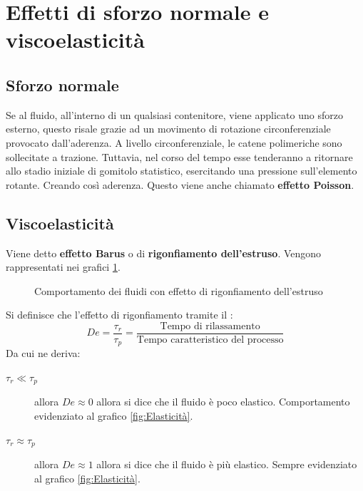 \section{Effetti di sforzo normale e viscoelasticità}
\subsection{Sforzo normale}
Se al fluido, all'interno di un qualsiasi contenitore, viene applicato uno sforzo esterno, questo risale grazie ad un movimento di rotazione circonferenziale provocato dall'aderenza.
A livello circonferenziale, le catene polimeriche sono sollecitate a trazione. Tuttavia, nel corso del tempo esse tenderanno a ritornare allo stadio iniziale di gomitolo statistico, esercitando una pressione sull'elemento rotante. Creando così aderenza.
Questo viene anche chiamato \textbf{effetto Poisson}.

\subsection{Viscoelasticità}
Viene detto \textbf{effetto Barus} o di \textbf{rigonfiamento dell'estruso}.
Vengono rappresentati nei grafici \ref{fig:RigonfiamentoEstruso}.

\begin{figure}
\centering
{}\quad
{}
\caption{Comportamento dei fluidi con effetto di rigonfiamento dell'estruso}
\label{fig:RigonfiamentoEstruso}
\end{figure}

Si definisce che l'effetto di rigonfiamento tramite il :
\begin{equation}
De = \frac{\tau_r}{\tau_p} = \frac{\text{Tempo di rilassamento}}{\text{Tempo caratteristico del processo}}
\end{equation}
Da cui ne deriva:
\begin{description}
\item[$\tau_r \ll \tau_p$] allora $De \approx 0$ allora si dice che il fluido è poco elastico. Comportamento evidenziato al grafico \ref{fig:Elasticità}.
\item[$\tau_r \approx \tau_p$] allora $De \approx 1$ allora si dice che il fluido è più elastico. Sempre evidenziato al grafico \ref{fig:Elasticità}.
\end{description}

